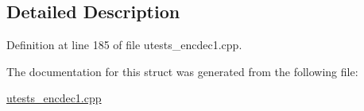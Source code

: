 \subsection{Detailed Description}


Definition at line 185 of file utests\+\_\+encdec1.\+cpp.



The documentation for this struct was generated from the following file\+:\begin{DoxyCompactItemize}
\item 
\hyperlink{utests__encdec1_8cpp}{utests\+\_\+encdec1.\+cpp}\end{DoxyCompactItemize}
